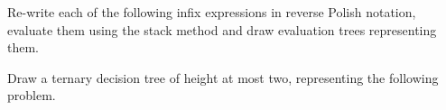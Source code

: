 \documentclass[addpoints,12pt]{exam}
\begin{document}

\begin{questions}

\question
  Re-write each of the following infix expressions in reverse Polish notation, evaluate them using the stack method and draw evaluation trees representing them.

\question
Draw a ternary decision tree of height at most two, representing the following problem.


\end{questions}
\end{document}
